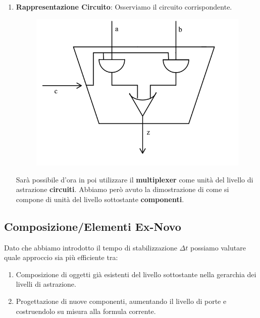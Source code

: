 \documentclass{article}
\begin{document}
\begin{enumerate}
    \item \textbf{Rappresentazione Circuito}: Osserviamo il circuito corrispondente.

    \begin{figure}[htbp]
        \center
        \includegraphics[scale=0.3]{img/multiplexer1.png}
    \end{figure}

    Sarà possibile d'ora in poi utilizzare il \textbf{multiplexer} come unità del livello di astrazione \textbf{circuiti}. Abbiamo però avuto la dimostrazione di come si compone di unità del livello sottostante \textbf{componenti}.
    
\end{enumerate}    

\vspace*{20px}

\subsection{Composizione/Elementi Ex-Novo}

Dato che abbiamo introdotto il tempo di stabilizzazione $\Delta t$ possiamo valutare quale approccio sia più efficiente tra:
\begin{enumerate}
    \item Composizione di oggetti già esistenti del livello sottostante nella gerarchia dei livelli di astrazione.
    \item Progettazione di nuove componenti, aumentando il livello di porte e costruendolo su misura alla formula corrente.
\end{enumerate}
\end{document}
